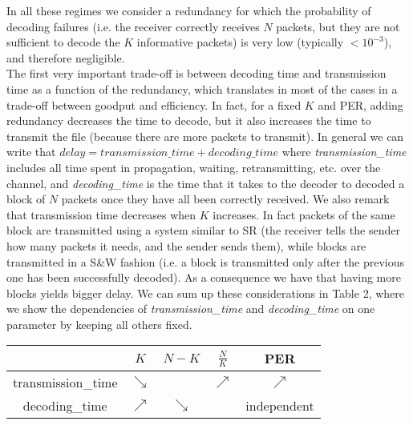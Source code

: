 In all these regimes we consider a redundancy for which the probability of decoding failures (i.e. the receiver correctly receives $N$ packets, but they are not sufficient to decode the $K$ informative packets) is very low (typically $<10^{-3}$), and therefore negligible. \\
The first very important trade-off is between decoding time and transmission time as a function of the redundancy, which translates in most of the cases in a trade-off between goodput and efficiency. In fact, for a fixed $K$ and PER, adding redundancy decreases the time to decode, but it also increases the time to transmit the file (because there are more packets to transmit). In general we can write that $delay=transmission\_time+decoding\_time$ where \emph{transmission\_time} includes all time spent in propagation, waiting, retransmitting, etc. over the channel, and \emph{decoding\_time} is the time that it takes to the decoder to decoded a block of $N$ packets once they have all been correctly received. We also remark that transmission time  decreases when $K$ increases. In fact packets of the same block are transmitted using a system similar to SR (the receiver tells the sender how many packets it needs, and the sender sends them), while blocks are transmitted in a S\&W fashion (i.e. a block is transmitted only after the previous one has been successfully decoded). As a consequence we have that having more blocks yields bigger delay. We can sum up these considerations in Table 2, where we show the dependencies of \emph{transmission\_time} and \emph{decoding\_time} on one parameter by keeping all others fixed.
\begin{center}
\begin{tabular}{c|c|c|c|c}

\toprule
&$K$&$N-K$&$\frac{N}{K}$&PER\\
\midrule
transmission\_time&$\searrow$& & $\nearrow$&$\nearrow$\\ \hline
decoding\_time&$\nearrow$&$\searrow$&&independent\\ 
\bottomrule
\end{tabular}
\end{center}

